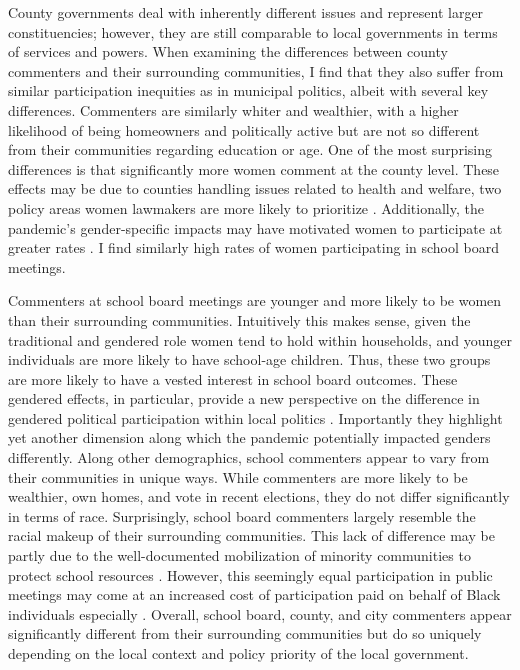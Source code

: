 County governments deal with inherently different issues and represent larger constituencies; however, they are still comparable to local governments in terms of services and powers. When examining the differences between county commenters and their surrounding communities, I find that they also suffer from similar participation inequities as in municipal politics, albeit with several key differences. Commenters are similarly whiter and wealthier, with a higher likelihood of being homeowners and politically active but are not so different from their communities regarding education or age. One of the most surprising differences is that significantly more women comment at the county level. These effects may be due to counties handling issues related to health and welfare, two policy areas women lawmakers are more likely to prioritize \citep[e.g., ][]{huddyConsequencesGenderStereotypes1993, voldenWomenIssuesTheir2018, paysonDecomposingSourceGender2023}. Additionally, the pandemic's gender-specific impacts may have motivated women to participate at greater rates \citep{carrerasWhoDoesCaring2023,johnsonGenderPoliticalLeadership2020}. I find similarly high rates of women participating in school board meetings.

Commenters at school board meetings are younger and more likely to be women than their surrounding communities. Intuitively this makes sense, given the traditional and gendered role women tend to hold within households, and younger individuals are more likely to have school-age children. Thus, these two groups are more likely to have a vested interest in school board outcomes. These gendered effects, in particular, provide a new perspective on the difference in gendered political participation within local politics \citep{coffeSameGameDifferent2010}. Importantly they highlight yet another dimension along which the pandemic potentially impacted genders differently. Along other demographics, school commenters appear to vary from their communities in unique ways. While commenters are more likely to be wealthier, own homes, and vote in recent elections, they do not differ significantly in terms of race. Surprisingly, school board commenters largely resemble the racial makeup of their surrounding communities. This lack of difference may be partly due to the well-documented mobilization of minority communities to protect school resources \citep{morelTakeoverRaceEducation2018,nuamahCloseHomePlaceBased2021,kitchensExitInvestSegregation2021}. However, this seemingly equal participation in public meetings may come at an increased cost of participation paid on behalf of Black individuals especially \citep[see][]{nuamahCostParticipatingPoor2021}. Overall, school board, county, and city commenters appear significantly different from their surrounding communities but do so uniquely depending on the local context and policy priority of the local government.


